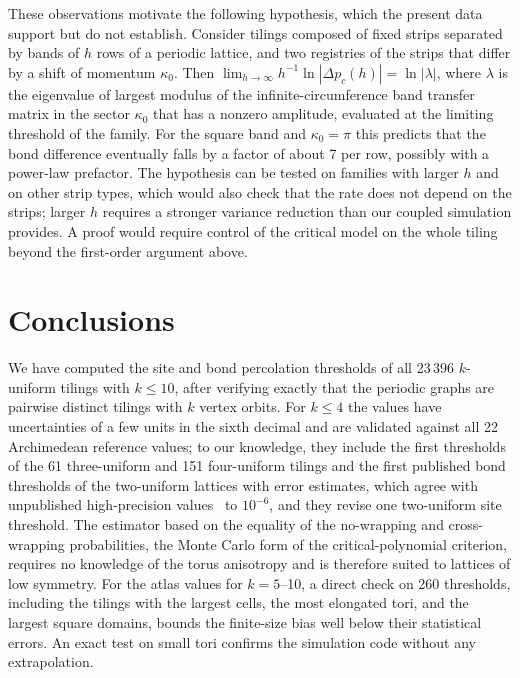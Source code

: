 \documentclass[pre,twocolumn,superscriptaddress,longbibliography,floatfix]{revtex4-2}
\newcommand{\pc}{p_c}
\begin{document}
These observations motivate the following hypothesis, which the present data support but do not establish. Consider tilings composed of fixed strips separated by bands of $h$ rows of a periodic lattice, and two registries of the strips that differ by a shift of momentum $\kappa_0$. Then $\lim_{h\to\infty}h^{-1}\ln|\Delta\pc(h)|=\ln|\lambda|$, where $\lambda$ is the eigenvalue of largest modulus of the infinite-circumference band transfer matrix in the sector $\kappa_0$ that has a nonzero amplitude, evaluated at the limiting threshold of the family. For the square band and $\kappa_0=\pi$ this predicts that the bond difference eventually falls by a factor of about 7 per row, possibly with a power-law prefactor. The hypothesis can be tested on families with larger $h$ and on other strip types, which would also check that the rate does not depend on the strips; larger $h$ requires a stronger variance reduction than our coupled simulation provides. A proof would require control of the critical model on the whole tiling beyond the first-order argument above.

\section{Conclusions}\label{sec:concl}

We have computed the site and bond percolation thresholds of all 23\,396 $k$-uniform tilings with $k\le10$, after verifying exactly that the periodic graphs are pairwise distinct tilings with $k$ vertex orbits. For $k\le4$ the values have uncertainties of a few units in the sixth decimal and are validated against all 22 Archimedean reference values; to our knowledge, they include the first thresholds of the 61 three-uniform and 151 four-uniform tilings and the first published bond thresholds of the two-uniform lattices with error estimates, which agree with unpublished high-precision values~\cite{GuZiff} to $10^{-6}$, and they revise one two-uniform site threshold. The estimator based on the equality of the no-wrapping and cross-wrapping probabilities, the Monte Carlo form of the critical-polynomial criterion, requires no knowledge of the torus anisotropy and is therefore suited to lattices of low symmetry. For the atlas values for $k=5$--10, a direct check on 260 thresholds, including the tilings with the largest cells, the most elongated tori, and the largest square domains, bounds the finite-size bias well below their statistical errors. An exact test on small tori confirms the simulation code without any extrapolation.
\end{document}
